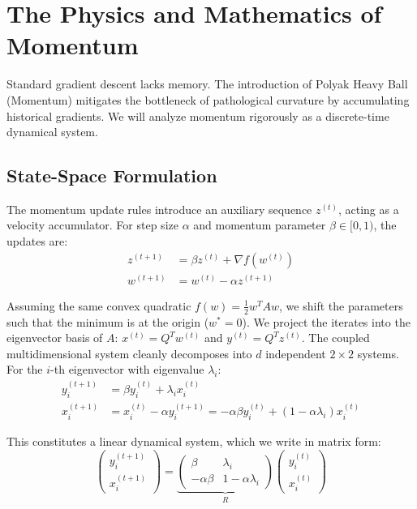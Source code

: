 \section{The Physics and Mathematics of Momentum}
\label{sec:momentum}

Standard gradient descent lacks memory. The introduction of Polyak Heavy Ball (Momentum) \cite{polyak1964some} mitigates the bottleneck of pathological curvature by accumulating historical gradients. We will analyze momentum rigorously as a discrete-time dynamical system.

\subsection{State-Space Formulation}
The momentum update rules introduce an auxiliary sequence $z^{(t)}$, acting as a velocity accumulator. For step size $\alpha$ and momentum parameter $\beta \in[0, 1)$, the updates are:
\begin{align}
    z^{(t+1)} &= \beta z^{(t)} + \nabla f(w^{(t)}) \\
    w^{(t+1)} &= w^{(t)} - \alpha z^{(t+1)}
\end{align}

Assuming the same convex quadratic $f(w) = \frac{1}{2} w^T A w$, we shift the parameters such that the minimum is at the origin ($w^* = 0$). We project the iterates into the eigenvector basis of $A$: $x^{(t)} = Q^T w^{(t)}$ and $y^{(t)} = Q^T z^{(t)}$. The coupled multidimensional system cleanly decomposes into $d$ independent $2 \times 2$ systems. For the $i$-th eigenvector with eigenvalue $\lambda_i$:
\begin{align}
    y_i^{(t+1)} &= \beta y_i^{(t)} + \lambda_i x_i^{(t)} \\
    x_i^{(t+1)} &= x_i^{(t)} - \alpha y_i^{(t+1)} = -\alpha \beta y_i^{(t)} + (1 - \alpha \lambda_i) x_i^{(t)}
\end{align}

This constitutes a linear dynamical system, which we write in matrix form:
\begin{equation}
    \begin{pmatrix} y_i^{(t+1)} \\ x_i^{(t+1)} \end{pmatrix} 
    = 
    \underbrace{
    \begin{pmatrix} \beta & \lambda_i \\ -\alpha\beta & 1 - \alpha\lambda_i \end{pmatrix}
    }_{R}
    \begin{pmatrix} y_i^{(t)} \\ x_i^{(t)} \end{pmatrix}
\end{equation}

